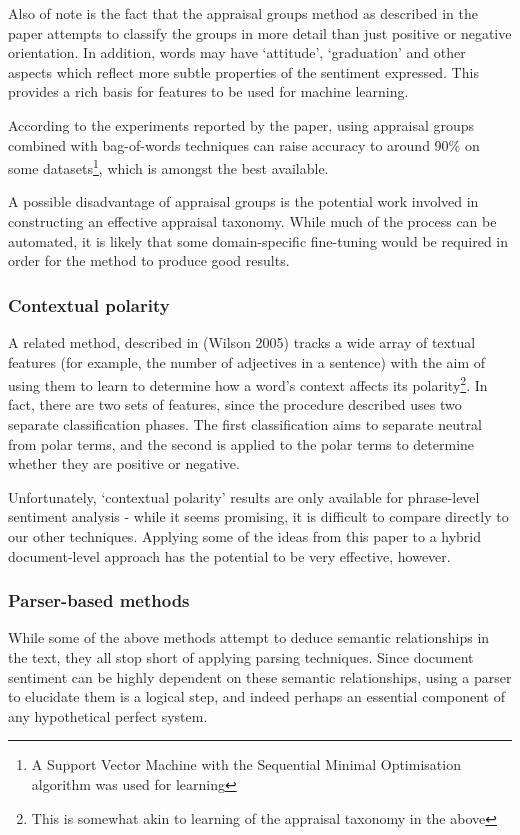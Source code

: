 \documentclass[11pt]{article}
\begin{document}
Also of note is the fact that the appraisal groups method as described in the
paper attempts to classify the groups in more detail than just positive or
negative orientation. In addition, words may have `attitude', `graduation' and
other aspects which reflect more subtle properties of the sentiment expressed.
This provides a rich basis for features to be used for machine learning.

According to the experiments reported by the paper, using appraisal groups
combined with bag-of-words techniques can raise accuracy to around 90\% on some
datasets\footnote{ A Support Vector Machine with the Sequential Minimal
Optimisation algorithm was used for learning}, which is amongst the best
available.

A possible disadvantage of appraisal groups is the potential work involved in
constructing an effective appraisal taxonomy. While much of the process can be
automated, it is likely that some domain-specific fine-tuning would be required
in order for the method to produce good results.

\subsubsection*{Contextual polarity}
A related method, described in (Wilson 2005)\cite{Wilson2005} tracks a wide
array of textual features (for example, the number of adjectives in a sentence)
with the aim of using them to learn to determine how a word's context affects
its polarity\footnote{This is somewhat akin to learning of the appraisal
taxonomy in the above}. In fact, there are two sets of features, since the
procedure described uses two separate classification phases. The first
classification aims to separate neutral from polar terms, and the second is
applied to the polar terms to determine whether they are positive or negative.

Unfortunately, `contextual polarity' results are only available for
phrase-level sentiment analysis - while it seems promising, it is difficult to
compare directly to our other techniques. Applying some of the ideas from this
paper to a hybrid document-level approach has the potential to be very
effective, however.

\subsubsection*{Parser-based methods}
While some of the above methods attempt to deduce semantic relationships in the
text, they all stop short of applying parsing techniques. Since document
sentiment can be highly dependent on these semantic relationships, using a
parser to elucidate them is a logical step, and indeed perhaps an essential
component of any hypothetical perfect system.
\end{document}

